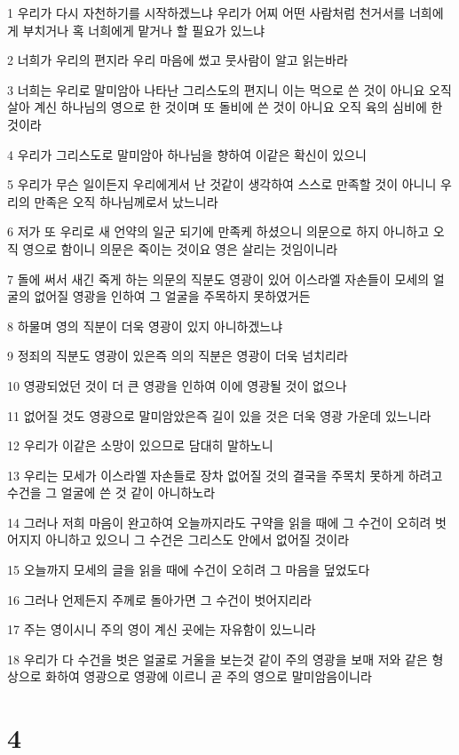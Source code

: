 \par 1 우리가 다시 자천하기를 시작하겠느냐 우리가 어찌 어떤 사람처럼 천거서를 너희에게 부치거나 혹 너희에게 맡거나 할 필요가 있느냐
\par 2 너희가 우리의 편지라 우리 마음에 썼고 뭇사람이 알고 읽는바라
\par 3 너희는 우리로 말미암아 나타난 그리스도의 편지니 이는 먹으로 쓴 것이 아니요 오직 살아 계신 하나님의 영으로 한 것이며 또 돌비에 쓴 것이 아니요 오직 육의 심비에 한 것이라
\par 4 우리가 그리스도로 말미암아 하나님을 향하여 이같은 확신이 있으니
\par 5 우리가 무슨 일이든지 우리에게서 난 것같이 생각하여 스스로 만족할 것이 아니니 우리의 만족은 오직 하나님께로서 났느니라
\par 6 저가 또 우리로 새 언약의 일군 되기에 만족케 하셨으니 의문으로 하지 아니하고 오직 영으로 함이니 의문은 죽이는 것이요 영은 살리는 것임이니라
\par 7 돌에 써서 새긴 죽게 하는 의문의 직분도 영광이 있어 이스라엘 자손들이 모세의 얼굴의 없어질 영광을 인하여 그 얼굴을 주목하지 못하였거든
\par 8 하물며 영의 직분이 더욱 영광이 있지 아니하겠느냐
\par 9 정죄의 직분도 영광이 있은즉 의의 직분은 영광이 더욱 넘치리라
\par 10 영광되었던 것이 더 큰 영광을 인하여 이에 영광될 것이 없으나
\par 11 없어질 것도 영광으로 말미암았은즉 길이 있을 것은 더욱 영광 가운데 있느니라
\par 12 우리가 이같은 소망이 있으므로 담대히 말하노니
\par 13 우리는 모세가 이스라엘 자손들로 장차 없어질 것의 결국을 주목치 못하게 하려고 수건을 그 얼굴에 쓴 것 같이 아니하노라
\par 14 그러나 저희 마음이 완고하여 오늘까지라도 구약을 읽을 때에 그 수건이 오히려 벗어지지 아니하고 있으니 그 수건은 그리스도 안에서 없어질 것이라
\par 15 오늘까지 모세의 글을 읽을 때에 수건이 오히려 그 마음을 덮었도다
\par 16 그러나 언제든지 주께로 돌아가면 그 수건이 벗어지리라
\par 17 주는 영이시니 주의 영이 계신 곳에는 자유함이 있느니라
\par 18 우리가 다 수건을 벗은 얼굴로 거울을 보는것 같이 주의 영광을 보매 저와 같은 형상으로 화하여 영광으로 영광에 이르니 곧 주의 영으로 말미암음이니라

\chapter{4}

